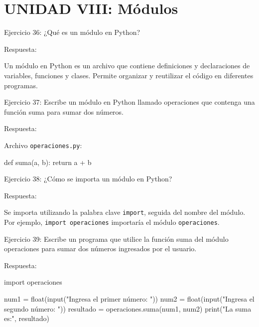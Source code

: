\documentclass[
  a4paper,
  onepage,
  openany]{scrreprt}
\newenvironment{Shaded}{\begin{snugshade}}{\end{snugshade}}
\newcommand{\BuiltInTok}[1]{\textcolor[rgb]{0.00,0.23,0.31}{#1}}
\newcommand{\ControlFlowTok}[1]{\textcolor[rgb]{0.00,0.23,0.31}{#1}}
\newcommand{\ImportTok}[1]{\textcolor[rgb]{0.00,0.46,0.62}{#1}}
\newcommand{\KeywordTok}[1]{\textcolor[rgb]{0.00,0.23,0.31}{#1}}
\newcommand{\NormalTok}[1]{\textcolor[rgb]{0.00,0.23,0.31}{#1}}
\newcommand{\OperatorTok}[1]{\textcolor[rgb]{0.37,0.37,0.37}{#1}}
\newcommand{\StringTok}[1]{\textcolor[rgb]{0.13,0.47,0.30}{#1}}
\begin{document}
\hypertarget{unidad-viii-muxf3dulos}{%
\section{UNIDAD VIII: Módulos}\label{unidad-viii-muxf3dulos}}

Ejercicio 36: ¿Qué es un módulo en Python?

Respuesta:

Un módulo en Python es un archivo que contiene definiciones y
declaraciones de variables, funciones y clases. Permite organizar y
reutilizar el código en diferentes programas.

Ejercicio 37: Escribe un módulo en Python llamado operaciones que
contenga una función suma para sumar dos números.

Respuesta:

Archivo \texttt{operaciones.py}:

\begin{Shaded}
\begin{Highlighting}[]
\KeywordTok{def}\NormalTok{ suma(a, b):}
    \ControlFlowTok{return}\NormalTok{ a }\OperatorTok{+}\NormalTok{ b}
\end{Highlighting}
\end{Shaded}

Ejercicio 38: ¿Cómo se importa un módulo en Python?

Respuesta:

Se importa utilizando la palabra clave \texttt{import}, seguida del
nombre del módulo. Por ejemplo, \texttt{import\ operaciones} importaría
el módulo \texttt{operaciones}.

Ejercicio 39: Escribe un programa que utilice la función suma del módulo
operaciones para sumar dos números ingresados por el usuario.

Respuesta:

\begin{Shaded}
\begin{Highlighting}[]
\ImportTok{import}\NormalTok{ operaciones}

\NormalTok{num1 }\OperatorTok{=} \BuiltInTok{float}\NormalTok{(}\BuiltInTok{input}\NormalTok{(}\StringTok{"Ingresa el primer número: "}\NormalTok{))}
\NormalTok{num2 }\OperatorTok{=} \BuiltInTok{float}\NormalTok{(}\BuiltInTok{input}\NormalTok{(}\StringTok{"Ingresa el segundo número: "}\NormalTok{))}
\NormalTok{resultado }\OperatorTok{=}\NormalTok{ operaciones.suma(num1, num2)}
\BuiltInTok{print}\NormalTok{(}\StringTok{"La suma es:"}\NormalTok{, resultado)}
\end{Highlighting}
\end{Shaded}
\end{document}
